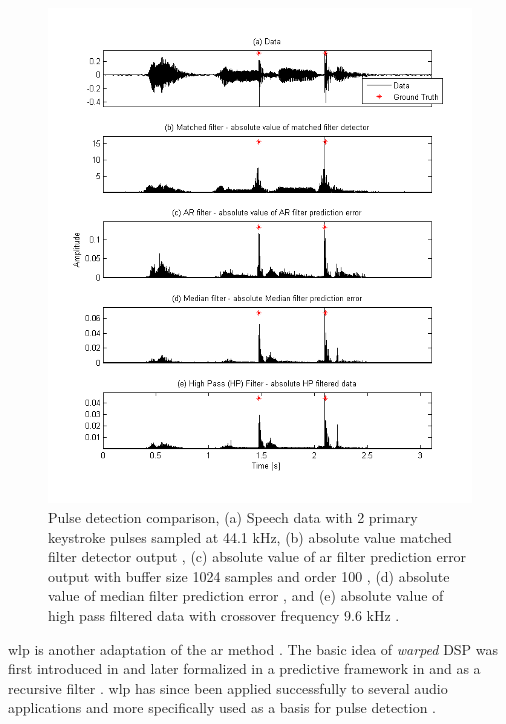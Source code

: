 \begin{figure}[!] %
\centering
\includegraphics[width=130mm]{LitRev_DetectCompare2New.png}
\caption{Pulse detection comparison, (a) Speech data with 2 primary keystroke pulses sampled at 44.1 kHz, (b) absolute value matched filter detector output \DIFaddbeginFL {}\DIFaddendFL , (c) absolute value of \DIFdelbeginFL {}\DIFdelendFL \DIFaddbeginFL \gls{ar} \DIFaddendFL filter prediction error output with buffer size 1024 samples and order 100 \DIFaddbeginFL {}\DIFaddendFL , (d) absolute value of median filter prediction error \DIFaddbeginFL {}\DIFaddendFL , and (e) absolute value of high pass filtered data with crossover frequency 9.6 kHz \DIFaddbeginFL {}\DIFaddendFL .}
\label{fig:LitRev_DetectCompare2}
\end{figure}

\DIFdelbegin {}\DIFdelend \DIFaddbegin \gls{wlp} \DIFaddend is another adaptation of the \DIFdelbegin {}\DIFdelend \DIFaddbegin \gls{ar} \DIFaddend method \cite{Esquef2002}. The basic idea of \emph{warped} DSP was first introduced in \cite{Oppenheim1983} and later formalized in a predictive framework in \cite{Strube1980} and as a recursive filter \cite{Steiglitz1980}. \DIFdelbegin {}\DIFdelend \DIFaddbegin \gls{wlp} \DIFaddend has since been applied successfully to several audio applications \cite{Karjalainen1997}\cite{Haermae2000} and more specifically used as a basis for pulse detection \cite{Esquef2000}\cite{Esquef2002}.

